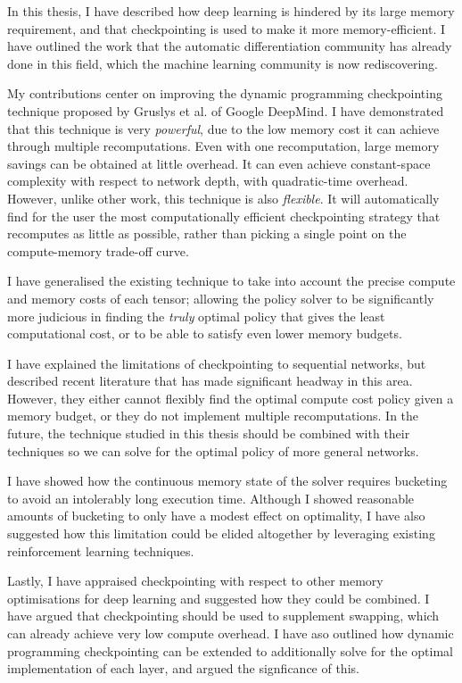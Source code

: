 In this thesis, I have described how deep learning is hindered by its large memory requirement, and that checkpointing is used to make it more memory-efficient.
I have outlined the work that the automatic differentiation community has already done in this field, which the machine learning community is now rediscovering.

My contributions center on improving the dynamic programming checkpointing technique proposed by Gruslys et al. of Google DeepMind.
I have demonstrated that this technique is very \textit{powerful}, due to the low memory cost it can achieve through multiple recomputations.
Even with one recomputation, large memory savings can be obtained at little overhead.
It can even achieve constant-space complexity with respect to network depth, with quadratic-time overhead.
However, unlike other work, this technique is also \textit{flexible}.
It will automatically find for the user the most computationally efficient checkpointing strategy that recomputes as little as possible, rather than picking a single point on the compute-memory trade-off curve.

I have generalised the existing technique to take into account the precise compute and memory costs of each tensor;
allowing the policy solver to be significantly more judicious in finding the \textit{truly} optimal policy that gives the least computational cost, or to be able to satisfy even lower memory budgets.


I have explained the limitations of checkpointing to sequential networks, but described recent literature that has made significant headway in this area.
However, they either cannot flexibly find the optimal compute cost policy given a memory budget, or they do not implement multiple recomputations.
In the future, the technique studied in this thesis should be combined with their techniques so we can solve for the optimal policy of more general networks.

I have showed how the continuous memory state of the solver requires bucketing to avoid an intolerably long execution time.
Although I showed reasonable amounts of bucketing to only have a modest effect on optimality, I have also suggested how this limitation could be elided altogether by leveraging existing reinforcement learning techniques.

Lastly, I have appraised checkpointing with respect to other memory optimisations for deep learning and suggested how they could be combined.
I have argued that checkpointing should be used to supplement swapping, which can already achieve very low compute overhead.
I have aso outlined how dynamic programming checkpointing can be extended to additionally solve for the optimal implementation of each layer, and argued the signficance of this.

